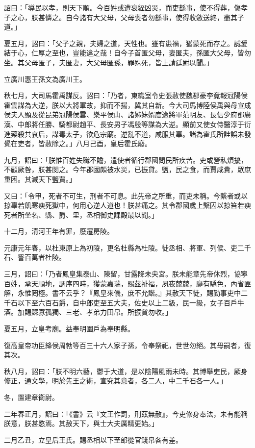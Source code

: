 \begin{pinyinscope}
詔曰：「導民以孝，則天下順。今百姓或遭衰絰凶災，而吏繇事，使不得葬，傷孝子之心，朕甚憐之。自今諸有大父母，父母喪者勿繇事，使得收斂送終，盡其子道。」

夏五月，詔曰：「父子之親，夫婦之道，天性也。雖有患禍，猶蒙死而存之。誠愛結于心，仁厚之至也，豈能違之哉！自今子首匿父母，妻匿夫，孫匿大父母，皆勿坐。其父母匿子，夫匿妻，大父母匿孫，罪殊死，皆上請廷尉以聞。」

立廣川惠王孫文為廣川王。

秋七月，大司馬霍禹謀反。詔曰：「乃者，東織室令史張赦使魏郡豪李竟報冠陽侯霍雲謀為大逆，朕以大將軍故，抑而不揚，冀其自新。今大司馬博陸侯禹與母宣成侯夫人顯及從昆弟冠陽侯雲、樂平侯山、諸姊妹婿度遼將軍范明友、長信少府鄧廣漢、中郎將任勝、騎都尉趙平、長安男子馮殷等謀為大逆。顯前又使女侍醫淳于衍進藥殺共哀后，謀毒太子，欲危宗廟。逆亂不道，咸服其辜。諸為霍氏所詿誤未發覺在吏者，皆赦除之。」八月己酉，皇后霍氏廢。

九月，詔曰：「朕惟百姓失職不贍，遣使者循行郡國問民所疾苦。吏或營私煩擾，不顧厥咎，朕甚閔之。今年郡國頗被水災，已振貸。鹽，民之食，而賈咸貴，眾庶重困。其減天下鹽賈。」

又曰：「令甲，死者不可生，刑者不可息。此先帝之所重，而吏未稱。今繫者或以掠辜若飢寒瘐死獄中，何用心逆人道也！朕甚痛之。其令郡國歲上繫囚以掠笞若瘐死者所坐名、縣、爵、里，丞相御史課殿最以聞。」

十二月，清河王年有罪，廢遷房陵。

元康元年春，以杜東原上為初陵，更名杜縣為杜陵。徙丞相、將軍、列侯、吏二千石、訾百萬者杜陵。

三月，詔曰：「乃者鳳皇集泰山、陳留，甘露降未央宮。朕未能章先帝休烈，協寧百姓，承天順地，調序四時，獲蒙嘉瑞，賜茲祉福，夙夜兢兢，靡有驕色，內省匪解，永惟罔極。書不云乎？『鳳皇來儀，庶不允諧。』其赦天下徒，賜勤事吏中二千石以下至六百石爵，自中郎吏至五大夫，佐史以上二級，民一級，女子百戶牛酒。加賜鰥寡孤獨、三老、孝弟力田帛。所振貸勿收。」

夏五月，立皇考廟。益奉明園戶為奉明縣。

復高皇帝功臣絳侯周勃等百三十六人家子孫，令奉祭祀，世世勿絕。其毋嗣者，復其次。

秋八月，詔曰：「朕不明六藝，鬱于大道，是以陰陽風雨未時。其博舉吏民，厥身修正，通文學，明於先王之術，宣究其意者，各二人，中二千石各一人。」

冬，置建章衛尉。

二年春正月，詔曰：「《書》云『文王作罰，刑茲無赦』，今吏修身奉法，未有能稱朕意，朕甚愍焉。其赦天下，與士大夫厲精更始。」

二月乙丑，立皇后王氏。賜丞相以下至郎從官錢帛各有差。


\end{pinyinscope}
